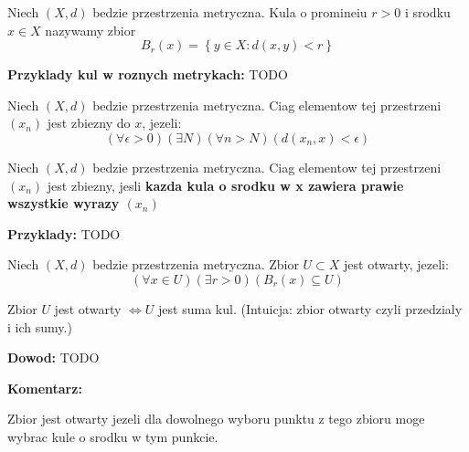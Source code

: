 \documentclass{article}
\begin{document}
\begin{tcolorbox}[colback=white!90!red,colframe=black!35!red,title=Definicja 1.3: Kula]

    Niech $(X,d)$ bedzie przestrzenia metryczna. Kula o promineiu $r>0$ i srodku $x\in X$ nazywamy zbior $$B_{r}(x) = \left\{ y \in X: d(x,y) < r \right\} $$

\end{tcolorbox}

\textbf{Przyklady kul w roznych metrykach:}
TODO

\begin{tcolorbox}[colback=white!90!red,colframe=black!35!red,title=Definicja 1.4: Zbieznosc ciagu.]

    Niech $(X,d)$ bedzie przestrzenia metryczna. Ciag elementow tej przestrzeni $(x_{n})$ jest zbiezny do $x$, jezeli:
    $$(\forall \epsilon > 0)(\exists N)(\forall n > N) (d(x_{n}, x) < \epsilon) $$
\end{tcolorbox}

\begin{tcolorbox}[colback=white!90!red,colframe=black!35!red,title=Definicja 1.5 Zbieznosc ciagu. Alternatywna definicja]

    Niech $(X,d)$ bedzie przestrzenia metryczna. Ciag elementow tej przestrzeni $(x_{n})$ jest zbiezny, jesli \textbf{kazda kula o srodku w x zawiera prawie wszystkie wyrazy $(x_{n})$}

\end{tcolorbox}
\textbf{Przyklady:}
TODO

\begin{tcolorbox}[colback=white!90!red,colframe=black!35!red,title=Definicja 1.6 Zbior otwarty.]

    Niech $(X,d)$ bedzie przestrzenia metryczna. Zbior $U \subset X$ jest otwarty, jezeli:
    $$(\forall x \in U)(\exists r > 0) (B_{r}(x) \subseteq U)$$
\end{tcolorbox}

\begin{tcolorbox}[colback=white!90!green,colframe=black!35!green,title=Fakt 1.7: Zbior otwarty jest suma kul]

    Zbior $U$ jest otwarty $\iff U$ jest suma kul.
    (Intuicja: zbior otwarty czyli przedzialy i ich sumy.)
\end{tcolorbox}
\textbf{Dowod:} TODO

\textbf{Komentarz:}

Zbior jest otwarty jezeli dla dowolnego wyboru punktu z tego zbioru moge wybrac kule o srodku w tym punkcie. 
\end{document}
